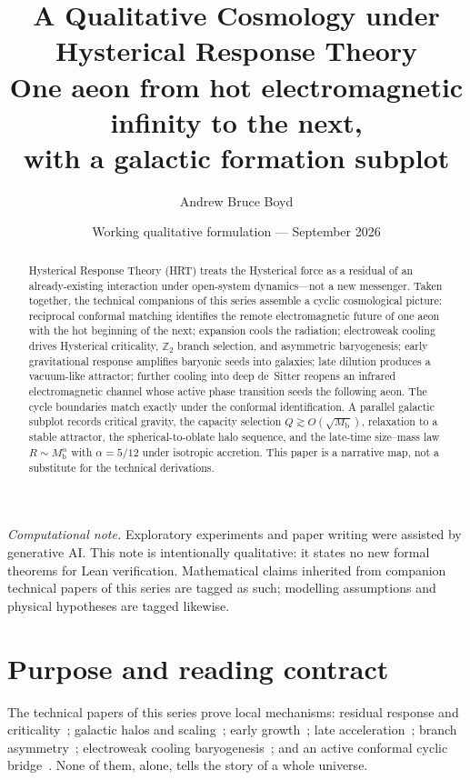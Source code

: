 \documentclass[11pt]{article}
\title{\textbf{A Qualitative Cosmology under Hysterical Response Theory}\\[0.35em]
\large One aeon from hot electromagnetic infinity to the next,\\
with a galactic formation subplot}
\author{Andrew Bruce Boyd}
\date{Working qualitative formulation --- September 2026}
\newcommand{\Mb}{M_{\mathrm{b}}}
\begin{document}
\maketitle
\noindent\textit{Computational note.}
Exploratory experiments and paper writing were assisted by generative AI.
This note is intentionally qualitative: it states no new formal theorems for Lean
verification.
Mathematical claims inherited from companion technical papers of this series are
tagged as such; modelling assumptions and physical hypotheses are tagged likewise.

\begin{abstract}
Hysterical Response Theory (HRT) treats the Hysterical force as a residual of an
already-existing interaction under open-system dynamics---not a new messenger.
Taken together, the technical companions of this series assemble a cyclic
cosmological picture: reciprocal conformal matching identifies the remote
electromagnetic future of one aeon with the hot beginning of the next; expansion
cools the radiation; electroweak cooling drives Hysterical criticality, $\mathbb Z_2$
branch selection, and asymmetric baryogenesis; early gravitational response
amplifies baryonic seeds into galaxies; late dilution produces a vacuum-like
attractor; further cooling into deep de~Sitter reopens an infrared electromagnetic
channel whose active phase transition seeds the following aeon.
The cycle boundaries match exactly under the conformal identification.
A parallel galactic subplot records critical gravity, the capacity selection
$Q\gtrsim O(\sqrt{\Mb})$, relaxation to a stable attractor, the spherical-to-oblate
halo sequence, and the late-time size--mass law $R\sim\Mb^{\alpha}$ with
$\alpha=5/12$ under isotropic accretion.
This paper is a narrative map, not a substitute for the technical derivations.
\end{abstract}
\tableofcontents
\newpage

\section{Purpose and reading contract}
\label{sec:purpose}
The technical papers of this series prove local mechanisms: residual response and
criticality~\cite{boyd2026response}; galactic halos and scaling~\cite{boyd2026galactic};
early growth~\cite{boyd2026early}; late acceleration~\cite{boyd2026late}; branch
asymmetry~\cite{boyd2026branch}; electroweak cooling
baryogenesis~\cite{boyd2026cooling}; and an active conformal cyclic
bridge~\cite{boyd2026ccc}.
None of them, alone, tells the story of a whole universe.
\end{document}
